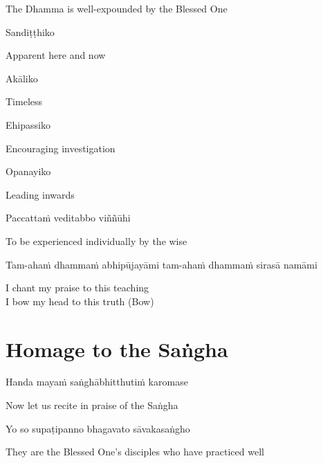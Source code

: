 \begin{cprenglish}
The Dhamma is well-expounded by the Blessed One
\end{cprenglish}

Sandiṭṭhiko

\begin{cprenglish}
Apparent here and now
\end{cprenglish}

Akāliko

\begin{cprenglish}
Timeless
\end{cprenglish}

Ehipassiko

\begin{cprenglish}
Encouraging investigation
\end{cprenglish}

Opanayiko

\begin{cprenglish}
Leading inwards
\end{cprenglish}

Paccattaṁ veditabbo viññūhi

\begin{cprenglish}
To be experienced individually by the wise
\end{cprenglish}

Tam-ahaṁ dhammaṁ abhipūjayāmi tam-ahaṁ dhammaṁ sirasā namāmi

\begin{cprenglish}
I chant my praise to this teaching\\
I bow my head to this truth (Bow)
\end{cprenglish}

\section*{Homage to the Saṅgha}

\begin{leader}
Handa mayaṁ saṅghābhitthutiṁ karomase
\end{leader}
\begin{leader}
Now let us recite in praise of the Saṅgha
\end{leader}

Yo so supaṭipanno bhagavato sāvakasaṅgho

\begin{cprenglish}
They are the Blessed One’s disciples who have practiced well
\end{cprenglish}

